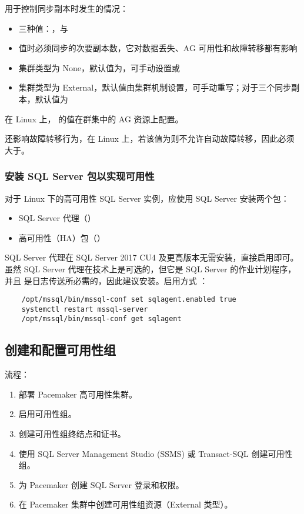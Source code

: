 \documentclass[UTF8]{ctexart}
\begin{document}
用于控制同步副本时发生的情况：

\begin{itemize}
	\item 三种值：，与
	\item 值时必须同步的次要副本数，它对数据丢失、AG 可用性和故障转移都有影响
	\item 集群类型为 None，默认值为，可手动设置或
	\item 集群类型为 External，默认值由集群机制设置，可手动重写；对于三个同步副本，默认值为
\end{itemize}

在 Linux 上， 的值在群集中的 AG 资源上配置。

 还影响故障转移行为，在 Linux 上，若该值为则不允许自动故障转移，因此必须大于。

\subsubsection*{安装 SQL Server 包以实现可用性}

对于 Linux 下的高可用性 SQL Server 实例，应使用 SQL Server 安装两个包：

\begin{itemize}
	\item SQL Server 代理（）
	\item 高可用性（HA）包（）
\end{itemize}

SQL Server 代理在 SQL Server 2017 CU4 及更高版本无需安装，直接启用即可。虽然 SQL Server 代理在技术上是可选的，但它是 SQL Server 的作业计划程序，并且
是日志传送所必需的，因此建议安装。启用方式 ：

\begin{lstlisting}
	/opt/mssql/bin/mssql-conf set sqlagent.enabled true
	systemctl restart mssql-server
	/opt/mssql/bin/mssql-conf get sqlagent
\end{lstlisting}

\subsection{创建和配置可用性组}

流程：

\begin{enumerate}
	\item 部署 Pacemaker 高可用性集群。
	\item 启用可用性组。
	\item 创建可用性组终结点和证书。
	\item 使用 SQL Server Management Studio (SSMS) 或 Transact-SQL 创建可用性组。
	\item 为 Pacemaker 创建 SQL Server 登录和权限。
	\item 在 Pacemaker 集群中创建可用性组资源（External 类型）。
\end{enumerate}
\end{document}
